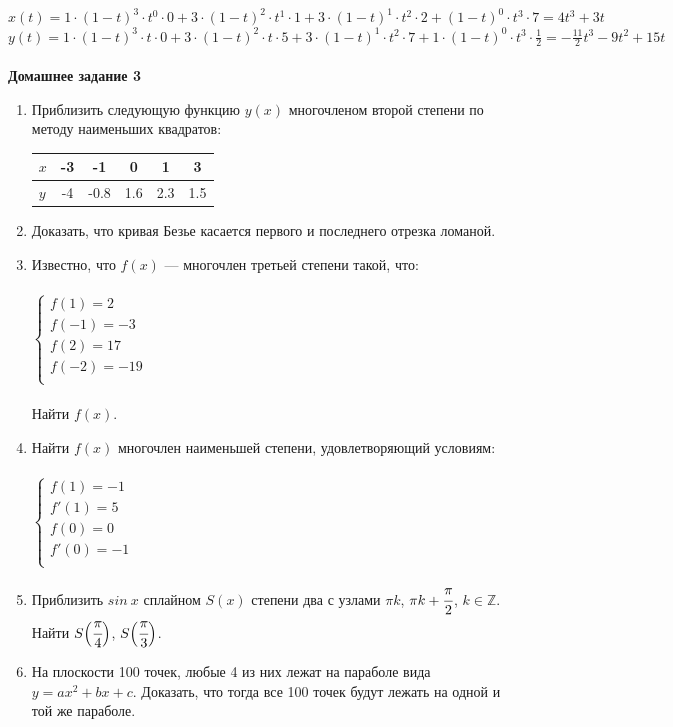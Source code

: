 \documentclass[12pt]{article}
\theoremstyle{definition}
\numberwithin{equation}{section}
\begin{document}
$x(t) = 1\cdot (1-t)^3\cdot t^0\cdot 0+3\cdot (1-t)^2\cdot t^1\cdot 1+3\cdot (1-t)^1\cdot t^2\cdot 2+(1-t)^0\cdot t^3\cdot 7 = 4t^3+3t$\\
$y(t) = 1\cdot (1-t)^3\cdot t\cdot 0+3\cdot (1-t)^2\cdot t\cdot 5+3\cdot (1-t)^1\cdot t^2\cdot 7+1\cdot (1-t)^0\cdot t^3\cdot \frac{1}{2} = - \frac{11}{2}t^3-9t^2+15t$\\ \\
\noindent \textbf{Домашнее задание 3}
\begin{enumerate}
\item Приблизить следующую функцию $y(x)$ многочленом второй степени по методу наименьших квадратов:\\
\begin{tabular}{|l|c|c|c|c|c|}
\hline
$x$ & -3 & -1 & 0 & 1 & 3 \\ \hline
$y$ & -4 & -0.8 & 1.6 & 2.3 & 1.5\\ \hline
\end{tabular}
\item
Доказать, что кривая Безье касается первого и последнего отрезка ломаной.
\item
Известно, что $f(x)$ --- многочлен третьей степени такой, что:\\ \\
$
\left\{
\begin{array}{lcl}
    f(1) = 2 \\
    f(-1) = -3 \\
    f(2) = 17\\
    f(-2) = -19\\
\end{array}
\right.
$\\
\\Найти $f(x)$.
\item
Найти $f(x)$ многочлен наименьшей степени, удовлетворяющий условиям:\\ \\
$
\left\{
\begin{array}{lcl}
    f(1) = -1 \\
    f'(1) = 5 \\
    f(0) = 0\\
    f'(0) = -1\\
\end{array}
\right.
$
\item
Приблизить $sin~x$ сплайном $S(x)$ степени два с узлами $\pi k$, $\pi k + \cfrac{\pi}{2}$, $k\in \mathbb{Z}$. Найти $S \Big(\cfrac{\pi}{4} \Big)$, $S \Big(\cfrac{\pi}{3} \Big)$.
\item На плоскости 100 точек, любые 4 из них лежат на параболе вида $y=ax^2+bx+c$. Доказать, что тогда все 100 точек будут лежать на одной и той же параболе.
\end{enumerate}
\end{document}
